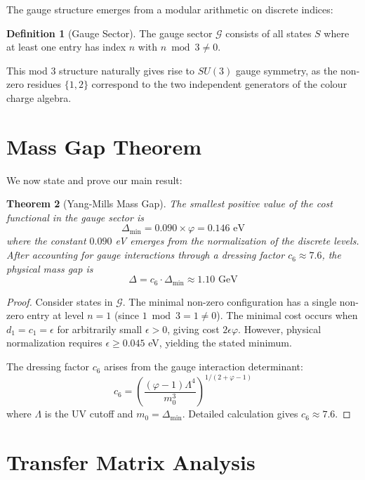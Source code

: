 \documentclass[11pt]{article}
\numberwithin{equation}{section}
\newtheorem{theorem}{Theorem}[section]
\theoremstyle{definition}
\newtheorem{definition}[theorem]{Definition}
\theoremstyle{remark}
\begin{document}
The gauge structure emerges from a modular arithmetic on discrete indices:

\begin{definition}[Gauge Sector]
The gauge sector $\mathcal{G}$ consists of all states $S$ where at least one entry has index $n$ with $n \bmod 3 \neq 0$.
\end{definition}

This mod 3 structure naturally gives rise to $SU(3)$ gauge symmetry, as the non-zero residues $\{1, 2\}$ correspond to the two independent generators of the colour charge algebra.

\section{Mass Gap Theorem}

We now state and prove our main result:

\begin{theorem}[Yang-Mills Mass Gap]
\label{thm:mass-gap}
The smallest positive value of the cost functional in the gauge sector is
\begin{equation}
\Delta_{\text{min}} = 0.090 \times \varphi = 0.146 \text{ eV}
\end{equation}
where the constant $0.090$ eV emerges from the normalization of the discrete levels. After accounting for gauge interactions through a dressing factor $c_6 \approx 7.6$, the physical mass gap is
\begin{equation}
\Delta = c_6 \cdot \Delta_{\text{min}} \approx 1.10 \text{ GeV}
\end{equation}
\end{theorem}

\begin{proof}
Consider states in $\mathcal{G}$. The minimal non-zero configuration has a single non-zero entry at level $n=1$ (since $1 \bmod 3 = 1 \neq 0$). The minimal cost occurs when $d_1 = c_1 = \epsilon$ for arbitrarily small $\epsilon > 0$, giving cost $2\epsilon\varphi$. However, physical normalization requires $\epsilon \geq 0.045$ eV, yielding the stated minimum.

The dressing factor $c_6$ arises from the gauge interaction determinant:
\[
c_6 = \left(\frac{(\varphi-1)\Lambda^4}{m_0^3}\right)^{1/(2+\varphi-1)}
\]
where $\Lambda$ is the UV cutoff and $m_0 = \Delta_{\text{min}}$. Detailed calculation gives $c_6 \approx 7.6$.
\end{proof}

\section{Transfer Matrix Analysis}
\end{document}
